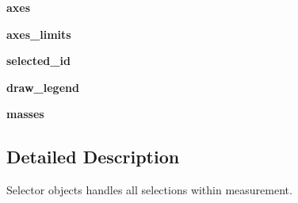 \begin{DoxyCompactItemize}
\item 
\hypertarget{classModules_1_1Selection_1_1Selector_ace6730171ad28c205cce42cc2d5c0623}{{\bfseries axes}}\label{classModules_1_1Selection_1_1Selector_ace6730171ad28c205cce42cc2d5c0623}

\item 
\hypertarget{classModules_1_1Selection_1_1Selector_af84047b4e4fea7995ef48d4590ad0462}{{\bfseries axes\-\_\-limits}}\label{classModules_1_1Selection_1_1Selector_af84047b4e4fea7995ef48d4590ad0462}

\item 
\hypertarget{classModules_1_1Selection_1_1Selector_ab6916839df1610b7c1a9161840fcfd7f}{{\bfseries selected\-\_\-id}}\label{classModules_1_1Selection_1_1Selector_ab6916839df1610b7c1a9161840fcfd7f}

\item 
\hypertarget{classModules_1_1Selection_1_1Selector_ae0390ab9d1fa7e3f6f3afb14a21c71af}{{\bfseries draw\-\_\-legend}}\label{classModules_1_1Selection_1_1Selector_ae0390ab9d1fa7e3f6f3afb14a21c71af}

\item 
\hypertarget{classModules_1_1Selection_1_1Selector_ac536aee139872904f170f2126ad88c8b}{{\bfseries masses}}\label{classModules_1_1Selection_1_1Selector_ac536aee139872904f170f2126ad88c8b}

\end{DoxyCompactItemize}


\subsection{Detailed Description}
\begin{DoxyVerb}Selector objects handles all selections within measurement.
\end{DoxyVerb}
 

